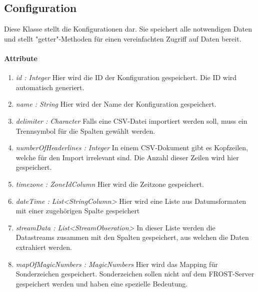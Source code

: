 \subsection{Configuration}
Diese Klasse stellt die Konfigurationen dar. 
Sie speichert alle notwendigen Daten und stellt "{getter}"{-Methoden} für einen vereinfachten Zugriff auf Daten bereit.

\paragraph{Attribute}

\begin{enumerate}[-]
	\item \textit{id : Integer} Hier wird die ID der Konfiguration gespeichert. Die ID wird automatisch generiert.
	
	\item \textit{name : String} Hier wird der Name der Konfiguration gespeichert.
	
	\item \textit{delimiter : Character} Falls eine CSV-Datei importiert werden soll, muss ein Trennsymbol für die Spalten gewählt werden.
	
	\item \textit{numberOfHeaderlines : Integer} In einem CSV-Dokument gibt es Kopfzeilen, welche für den Import irrelevant sind. Die Anzahl dieser Zeilen wird hier gespeichert.
	
	\item \textit{timezone : ZoneIdColumn} Hier wird die Zeitzone gespeichert.
	
	\item \textit{dateTime : List<StringColumn>} Hier wird eine Liste aus Datumsformaten mit einer zugehörigen Spalte gespeichert 
	
	\item \textit{streamData : List<StreamObseration>} In dieser Liste werden die Datastreams zusammen mit den Spalten gespeichert, aus welchen die Daten extrahiert werden.
	
	\item \textit{mapOfMagicNumbers : MagicNumbers} Hier wird das Mapping für Sonderzeichen gespeichert. Sonderzeichen sollen nicht auf dem FROST-Server gespeichert werden und haben eine spezielle Bedeutung.
\end{enumerate}

